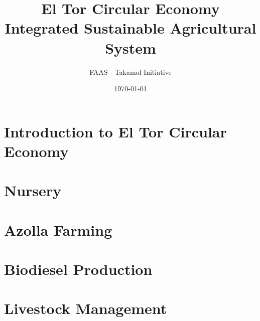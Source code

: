 \documentclass[12pt,a4paper]{report}
\title{El Tor Circular Economy\\
\large Integrated Sustainable Agricultural System}
\author{FAAS - Takamol Initiative}
\date{\today}
\begin{document}
\maketitle
\tableofcontents

\chapter{Introduction to El Tor Circular Economy}


\chapter{Nursery}









\chapter{Azolla Farming}









\chapter{Biodiesel Production}









\chapter{Livestock Management}








\end{document}
